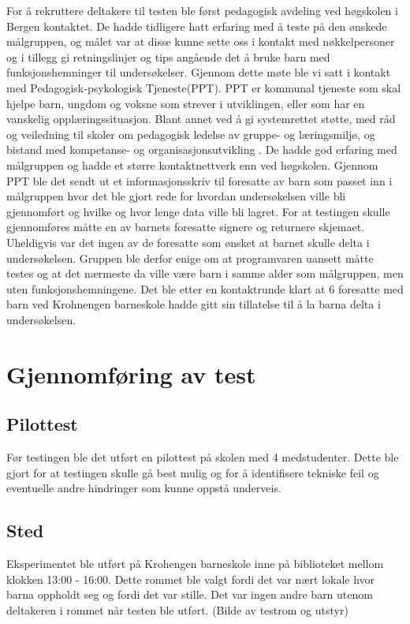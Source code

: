  
For å rekruttere deltakere til testen ble først pedagogisk avdeling ved høgskolen i Bergen kontaktet. De hadde tidligere hatt erfaring med å teste på den ønskede målgruppen, og målet var at disse kunne sette oss i kontakt med nøkkelpersoner og i tillegg gi retningslinjer og tips angående det å bruke barn med funksjonshemninger til undersøkelser. Gjennom dette møte ble vi satt i kontakt med Pedagogisk-psykologisk Tjeneste(PPT). PPT er kommunal tjeneste som skal hjelpe barn, ungdom og voksne som strever i utviklingen, eller som har en vanskelig opplæringssituasjon. Blant annet ved å gi systemrettet støtte, med råd og veiledning til skoler om pedagogisk ledelse av gruppe- og læringsmiljø, og bistand med kompetanse- og organisasjonsutvikling \cite{Udir.5:online}. De hadde god erfaring med målgruppen og hadde et større kontaktnettverk enn ved høgskolen. Gjennom PPT ble det sendt ut et informasjonsskriv til foresatte av barn som passet inn i målgruppen hvor det ble gjort rede for hvordan undersøkelsen ville bli gjennomført og hvilke og hvor lenge data ville bli lagret. For at testingen skulle gjennomføres måtte en av barnets foresatte signere og returnere skjemaet. Uheldigvis var det ingen av de foresatte som ønsket at barnet skulle delta i undersøkelsen. Gruppen ble derfor enige om at programvaren uansett måtte testes og at det nærmeste da ville være barn i samme alder som målgruppen, men uten funksjonshemningene. Det ble etter en kontaktrunde klart at 6 foresatte med barn ved Krohnengen barneskole hadde gitt sin tillatelse til å la barna delta i undersøkelsen. 
 
 
\section{Gjennomføring av test} 
 
 
\subsection{Pilottest} 
 
 
Før testingen ble det utført en pilottest på skolen med 4 medstudenter. Dette ble gjort for at testingen skulle gå best mulig og for å identifisere tekniske feil og eventuelle andre hindringer som kunne oppstå underveis.  
 
 
\subsection{Sted} 
Eksperimentet ble utført på Krohengen barneskole inne på biblioteket mellom klokken 13:00 - 
16:00. Dette rommet ble valgt fordi det var nært lokale hvor barna oppholdt seg og fordi det var 
stille. Det var ingen andre barn utenom deltakeren i rommet når testen ble utført. 
(Bilde av testrom og utstyr)  
 
